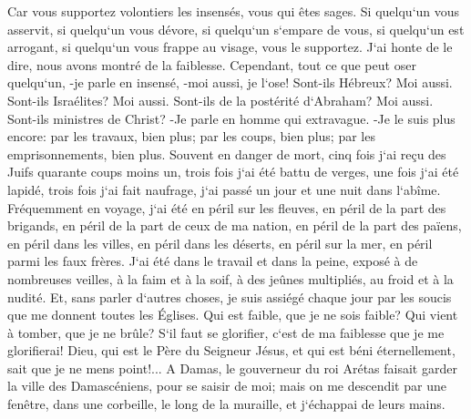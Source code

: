 \verse Car vous supportez volontiers les insensés, vous qui êtes sages. 
\verse Si quelqu`un vous asservit, si quelqu`un vous dévore, si quelqu`un s`empare de vous, si quelqu`un est arrogant, si quelqu`un vous frappe au visage, vous le supportez. 
\verse J`ai honte de le dire, nous avons montré de la faiblesse. Cependant, tout ce que peut oser quelqu`un, -je parle en insensé, -moi aussi, je l`ose! 
\verse Sont-ils Hébreux? Moi aussi. Sont-ils Israélites? Moi aussi. Sont-ils de la postérité d`Abraham? Moi aussi. 
\verse Sont-ils ministres de Christ? -Je parle en homme qui extravague. -Je le suis plus encore: par les travaux, bien plus; par les coups, bien plus; par les emprisonnements, bien plus. Souvent en danger de mort, 
\verse cinq fois j`ai reçu des Juifs quarante coups moins un, 
\verse trois fois j`ai été battu de verges, une fois j`ai été lapidé, trois fois j`ai fait naufrage, j`ai passé un jour et une nuit dans l`abîme. 
\verse Fréquemment en voyage, j`ai été en péril sur les fleuves, en péril de la part des brigands, en péril de la part de ceux de ma nation, en péril de la part des païens, en péril dans les villes, en péril dans les déserts, en péril sur la mer, en péril parmi les faux frères. 
\verse J`ai été dans le travail et dans la peine, exposé à de nombreuses veilles, à la faim et à la soif, à des jeûnes multipliés, au froid et à la nudité. 
\verse Et, sans parler d`autres choses, je suis assiégé chaque jour par les soucis que me donnent toutes les Églises. 
\verse Qui est faible, que je ne sois faible? Qui vient à tomber, que je ne brûle? 
\verse S`il faut se glorifier, c`est de ma faiblesse que je me glorifierai! 
\verse Dieu, qui est le Père du Seigneur Jésus, et qui est béni éternellement, sait que je ne mens point!... 
\verse A Damas, le gouverneur du roi Arétas faisait garder la ville des Damascéniens, pour se saisir de moi; 
\verse mais on me descendit par une fenêtre, dans une corbeille, le long de la muraille, et j`échappai de leurs mains. 

